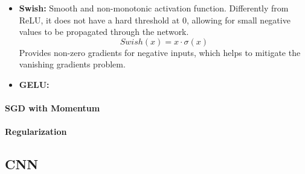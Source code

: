 \begin{itemize}
    \item \textbf{Swish:} Smooth and non-monotonic activation function. 
    Differently from ReLU, it does not have a hard threshold at 0, allowing for small negative values to be propagated through the network.
    \[ Swish(x) = x \cdot \sigma(x) \]
    Provides non-zero gradients for negative inputs, which helps to mitigate the vanishing gradients problem.

    \item \textbf{GELU:}
\end{itemize}
    
\paragraph{SGD with Momentum}

\paragraph{Regularization}

\subsection{CNN}
